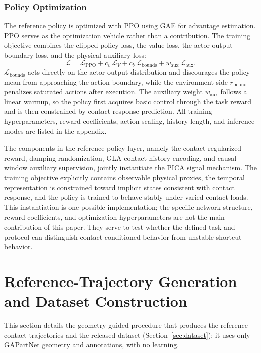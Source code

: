 \subsubsection{Policy Optimization}
\label{sec:opt}

The reference policy is optimized with PPO using GAE for advantage
estimation. PPO serves as the optimization vehicle rather than a
contribution. The training objective combines the clipped policy
loss, the value loss, the actor output-boundary loss, and the
physical auxiliary loss:
\begin{equation}
\mathcal{L} = \mathcal{L}_{\mathrm{PPO}}
+ c_v\,\mathcal{L}_V
+ c_b\,\mathcal{L}_{\mathrm{bounds}}
+ w_{\mathrm{aux}}\,\mathcal{L}_{\mathrm{aux}}.
\label{eq:opt}
\end{equation}
$\mathcal{L}_{\mathrm{bounds}}$ acts directly on the actor output
distribution and discourages the policy mean from approaching the
action boundary, while the environment-side $r_{\mathrm{bound}}$
penalizes saturated actions after execution.
The auxiliary weight $w_{\mathrm{aux}}$ follows a linear warmup, so
the policy first acquires basic control through the task reward and
is then constrained by contact-response prediction. All training
hyperparameters, reward coefficients, action scaling, history
length, and inference modes are listed in the appendix.

The components in the reference-policy layer, namely the
contact-regularized reward, damping randomization, GLA
contact-history encoding, and causal-window auxiliary supervision,
jointly instantiate the PICA signal mechanism. The training
objective explicitly contains observable physical proxies, the
temporal representation is constrained toward implicit states
consistent with contact response, and the policy is trained to
behave stably under varied contact loads. This instantiation is one
possible implementation; the specific network structure, reward
coefficients, and optimization hyperparameters are not the main
contribution of this paper. They serve to test whether the defined
task and protocol can distinguish contact-conditioned behavior from
unstable shortcut behavior.


\section{Reference-Trajectory Generation and Dataset Construction}
\label{sec:trajgen}

This section details the geometry-guided procedure that produces the reference contact trajectories and the released dataset (Section~\ref{sec:dataset}); it uses only GAPartNet geometry and annotations, with no learning.


